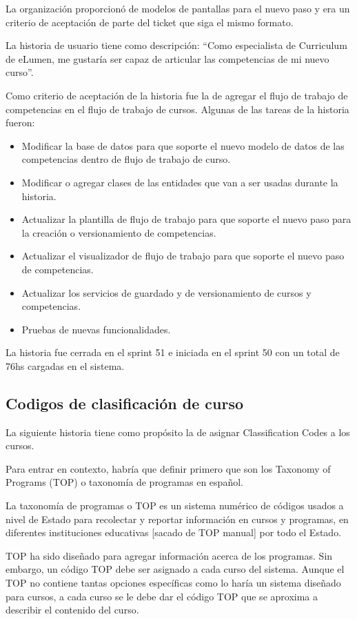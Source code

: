 La organización proporcionó de modelos de pantallas para el nuevo paso y era un criterio de aceptación de parte del ticket que siga el mismo formato.

La historia de usuario tiene como descripción: “Como especialista de Curriculum de eLumen, me gustaría ser capaz de articular las competencias de mi nuevo curso”.

Como criterio de aceptación de la historia fue la de agregar el flujo de trabajo de competencias en el flujo de trabajo de cursos. Algunas de las tareas de la historia fueron:
\begin{itemize}
	\item Modificar la base de datos para que soporte el nuevo modelo de datos de las competencias dentro de flujo de trabajo de curso.
	\item Modificar o agregar clases de las entidades que van a ser usadas durante la historia.
	\item Actualizar la plantilla de flujo de trabajo para que soporte el nuevo paso para la creación o versionamiento de competencias.
	\item Actualizar el visualizador de flujo de trabajo para que soporte el nuevo paso de competencias.
	\item Actualizar los servicios de guardado y de versionamiento de cursos y competencias.
	\item Pruebas de nuevas funcionalidades.
\end{itemize}

La historia fue cerrada en el sprint 51 e iniciada en el sprint 50 con un total de 76hs cargadas en el sistema.

\subsection{Codigos de clasificación de curso}
La siguiente historia tiene como propósito la de asignar Classification Codes a los cursos.

Para entrar en contexto, habría que definir primero que son los Taxonomy of Programs (TOP) o taxonomía de programas en español.

La taxonomía de programas o TOP es un sistema numérico de códigos usados a nivel de Estado para recolectar y reportar información en cursos y programas, en diferentes instituciones educativas [sacado de TOP manual] por todo el Estado. 

TOP ha sido diseñado para agregar información acerca de los programas. Sin embargo, un código TOP debe ser asignado a cada curso del sistema. Aunque el TOP no contiene tantas opciones específicas como lo haría un sistema diseñado para cursos, a cada curso se le debe dar el código TOP que se aproxima a describir el contenido del curso.

